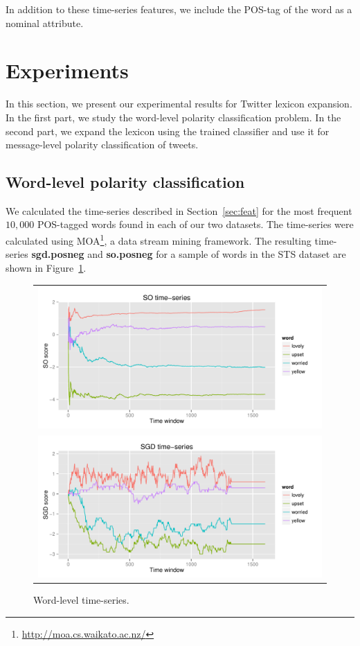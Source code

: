 \documentclass{sig-alternate}
\begin{document}
In addition to these time-series features, we include the POS-tag of the word as a nominal attribute.



\section{Experiments}\label{sec:lex_expand}

In this section, we present our experimental results for Twitter lexicon expansion. In the first part, we study the word-level polarity classification problem. In the second part, we expand the lexicon using the trained classifier and use it for message-level  polarity classification of tweets. 

\subsection{Word-level polarity classification}

We calculated the time-series described in Section~\ref{sec:feat} for the most frequent $10,000$ POS-tagged words found in each of our two datasets. The time-series were calculated using MOA\footnote{\url{http://moa.cs.waikato.ac.nz/}}, a data stream mining framework. The resulting time-series \textbf{sgd.posneg} and \textbf{so.posneg} for a sample of words in the STS dataset are shown in Figure~\ref{fig:timeseries}. 

\begin{figure}[htb]
\begin{center}
\begin{tabular}{c}
\includegraphics[scale=0.45]{SOseries.pdf} \\
\includegraphics[scale=0.45]{SGDseries.pdf}\\
\end{tabular}
\caption{Word-level time-series.}
\label{fig:timeseries}
\end{center}
\end{figure}
\end{document}
